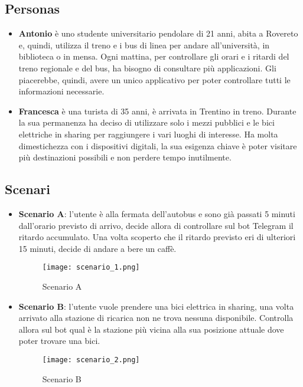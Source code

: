 \subsection{Personas}
\begin{itemize}
\item \textbf{Antonio} è uno studente universitario pendolare di 21 anni, abita a Rovereto e, quindi, utilizza il treno e i bus di linea per andare all'università, in biblioteca o in mensa. Ogni mattina, per controllare gli orari e i ritardi del treno regionale e del bus, ha bisogno di consultare più applicazioni. Gli piacerebbe, quindi, avere un unico applicativo per poter controllare tutti le informazioni necessarie.
\item \textbf{Francesca} è una turista di 35 anni, è arrivata in Trentino in treno. Durante la sua permanenza ha deciso di utilizzare solo i mezzi pubblici e le bici elettriche in sharing per raggiungere i vari luoghi di interesse. Ha molta dimestichezza con i dispositivi digitali, la sua esigenza chiave è poter visitare più destinazioni possibili e non perdere tempo inutilmente.  
\end{itemize}

\subsection{Scenari}
\begin{itemize}
\item \textbf{Scenario A}: l'utente è alla fermata dell'autobus e sono già passati 5 minuti dall'orario previsto di arrivo, decide allora di controllare sul bot Telegram il ritardo accumulato. Una volta scoperto che il ritardo previsto eri di ulteriori 15 minuti, decide di andare a bere un caffè. 

\begin{figure}[h]
\centering
\texttt{[image: scenario\_1.png]}
\caption{Scenario A}
\label{fig:scenarios_A}
\end{figure}

\item \textbf{Scenario B}: l'utente vuole prendere una bici elettrica in sharing, una volta arrivato alla stazione di ricarica non ne trova nessuna disponibile. Controlla allora sul bot qual è la stazione più vicina alla sua posizione attuale dove poter trovare una bici. 

\begin{figure}[h]
\centering
\texttt{[image: scenario\_2.png]}
\caption{Scenario B}
\label{fig:scenarios_B}
\end{figure}

\end{itemize}

